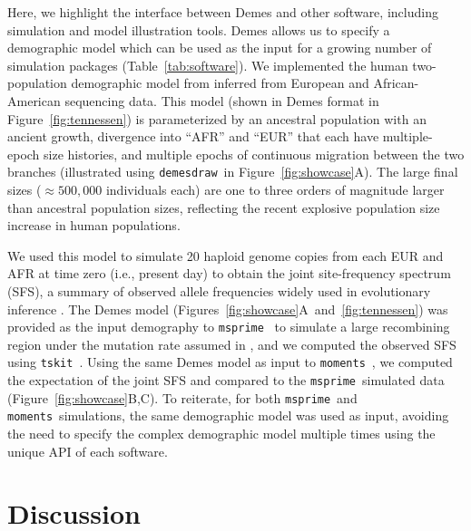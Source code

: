 \documentclass[11pt]{article}
\newcommand{\msprime}[0]{\texttt{msprime}}
\newcommand{\demesdraw}[0]{\texttt{demesdraw}}
\newcommand{\moments}[0]{\texttt{moments}}
\newcommand{\tskit}[0]{\texttt{tskit}}
\begin{document}
Here, we highlight the interface between Demes and other software, including
simulation and model illustration tools. Demes allows us to specify a
demographic model which can be used as the input for a growing
number of simulation packages (Table~\ref{tab:software}). We implemented the
human two-population demographic model from \citet{tennessen2012evolution}
inferred from European and African-American sequencing data. This model (shown
in Demes format in Figure~\ref{fig:tennessen}) is parameterized by an ancestral
population with an ancient growth, divergence into ``AFR'' and ``EUR'' that
each have multiple-epoch size histories, and multiple epochs of continuous
migration between the two branches (illustrated using \demesdraw\ in
Figure~\ref{fig:showcase}A). The large final sizes (\(\approx 500,000\)
individuals each) are one to three orders of magnitude larger than ancestral
population sizes, reflecting the recent explosive population size increase in
human populations.

We used this model to simulate 20 haploid genome copies from each EUR and AFR
at time zero (i.e., present day) to obtain the joint site-frequency spectrum
(SFS), a summary of observed allele frequencies widely used in evolutionary
inference
\citep{bustamante2001directional,gutenkunst2009inferring,tennessen2012evolution,
jouganous2017inferring,kamm2017efficient,kim2017inference}.
The Demes model (Figures~\ref{fig:showcase}A~and~\ref{fig:tennessen}) was
provided as the input demography to \msprime\ \citep{baumdicker2021-iu} to
simulate a large recombining region under the mutation rate assumed in
\citet{tennessen2012evolution}, and we computed the observed SFS using \tskit\
\citep{ralph2020efficiently}. Using the same Demes model as input to \moments\
\citep{jouganous2017inferring}, we computed the expectation of the joint SFS
and compared to the \msprime\ simulated data (Figure~\ref{fig:showcase}B,C).
To reiterate, for both \msprime\ and \moments\ simulations, the same
demographic model was used as input, avoiding the need to specify the complex
demographic model multiple times using the unique API of each software.

\section*{Discussion}
\end{document}
